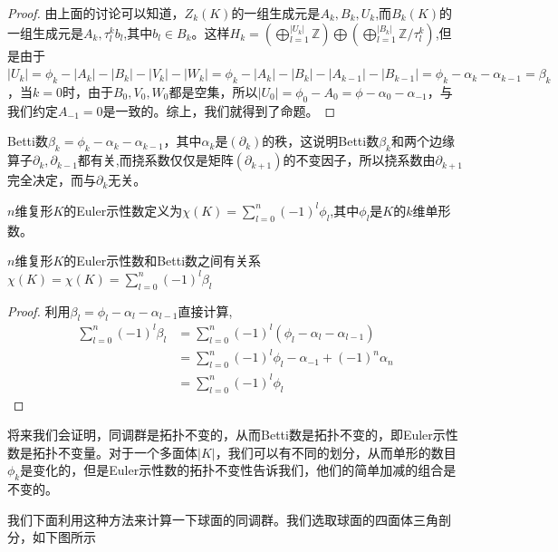 \begin{proof}
由上面的讨论可以知道，$Z_{k}(K)$的一组生成元是$A_{k},B_{k},U_{k}$,而$B_{k}(K)$的一组生成元是$A_{k},\tau^{k}_{l}b_{l}$,其中$b_{l}\in B_{k}$。这样$H_{k}=\left(\bigoplus\limits_{l=1}^{|U_{k}|}\mathbb{Z}\right)\bigoplus\left(\bigoplus\limits_{l=1}^{|B_{k}|}\mathbb{Z}/\tau_{l}^{k}\right)$,但是由于$|U_{k}|=\phi_{k}-|A_{k}|-|B_{k}|-|V_{k}|-|W_{k}|=\phi_{k}-|A_{k}|-|B_{k}|-|A_{k-1}|-|B_{k-1}|=\phi_{k}-\alpha_{k}-\alpha_{k-1}=\beta_{k}$，当$k=0$时，由于$B_{0},V_{0},W_{0}$都是空集，所以$|U_{0}|=\phi_{0}-A_{0}=\phi-\alpha_{0}-\alpha_{-1}$，与我们约定$A_{-1}=0$是一致的。综上，我们就得到了命题。
\end{proof}
\begin{remark}
Betti数$\beta_{k}=\phi_{k}-\alpha_{k}-\alpha_{k-1}$，其中$\alpha_{k}$是$(\partial_{k})$的秩，这说明Betti数$\beta_{k}$和两个边缘算子$\partial_{k},\partial_{k-1}$都有关,而挠系数仅仅是矩阵$(\partial_{k+1})$的不变因子，所以挠系数由$\partial_{k+1}$完全决定，而与$\partial_{k}$无关。
\end{remark}
\begin{definition}
$n$维复形$K$的Euler示性数定义为$\chi(K)=\sum\limits_{l=0}^{n}(-1)^{l}\phi_{l}$,其中$\phi_{l}$是$K$的$k$维单形数。
\end{definition}
\begin{proposition}
$n$维复形$K$的Euler示性数和Betti数之间有关系$\chi(K)=\chi(K)=\sum\limits_{l=0}^{n}(-1)^{l}\beta_{l}$
\end{proposition}
\begin{proof}
利用$\beta_{l}=\phi_{l}-\alpha_{l}-\alpha_{l-1}$直接计算,
\begin{equation*}
    \begin{aligned}
      \sum\limits_{l=0}^{n}(-1)^{l}\beta_{l}&=\sum\limits_{l=0}^{n}(-1)^{l}(\phi_{l}-\alpha_{l}-\alpha_{l-1})\\
      &=\sum\limits_{l=0}^{n}(-1)^{l}\phi_{l}-\alpha_{-1}+(-1)^{n}\alpha_{n}\\
      &=\sum\limits_{l=0}^{n}(-1)^{l}\phi_{l}
    \end{aligned}
\end{equation*}
\end{proof}
\begin{remark}
将来我们会证明，同调群是拓扑不变的，从而Betti数是拓扑不变的，即Euler示性数是拓扑不变量。对于一个多面体$|K|$，我们可以有不同的划分，从而单形的数目$\phi_{k}$是变化的，但是Euler示性数的拓扑不变性告诉我们，他们的简单加减的组合是不变的。
\end{remark}
我们下面利用这种方法来计算一下球面的同调群。我们选取球面的四面体三角剖分，如下图所示
